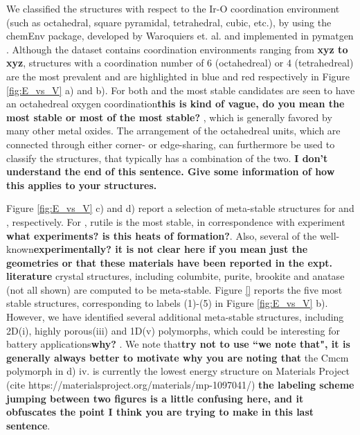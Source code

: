 We classified the structures with respect to the Ir-O coordination environment (such as octahedral, square pyramidal, tetrahedral, cubic, etc.), by using the chemEnv package, developed by Waroquiers et. al. \cite{Waroquiers2017} and implemented in pymatgen \cite{Ong2013}. Although the dataset contains  coordination environments ranging from \textbf{xyz to xyz}, structures with a coordination number of 6 (octahedreal) or 4 (tetrahedreal) are the most prevalent and are highlighted in blue and red respectively in Figure \ref{fig:E_vs_V} a) and b). For both \IrOtwo and \IrOthree the most stable candidates are seen to have an octahedreal oxygen coordination\textbf{this is kind of vague, do you mean the most stable or most of the most stable?} , which is generally favored by many other metal oxides. \cite{Waroquiers2017} The arrangement of the octahedreal units, which are connected through either corner- or edge-sharing, can furthermore be used to classify the structures, that typically has a combination of the two. \textbf{I don't understand the end of this sentence.  Give some information of how this applies to your structures.}

Figure \ref{fig:E_vs_V} c) and d) report a selection of meta-stable structures for \IrOtwo and \IrOthree, respectively. For \IrOtwo, rutile is the most stable, in correspondence with experiment \cite{}\textbf{what experiments?  is this  heats of formation?}. Also, several of the well-known\textbf{experimentally?  it is not clear here if you mean just the geometries or that these materials have been reported in the expt. literature} crystal structures, including  columbite, purite, brookite and anatase (not all shown) are computed to be meta-stable.
Figure \ref{} reports the five most stable \IrOthree structures, corresponding to labels (1)-(5) in Figure \ref{fig:E_vs_V} b). However, we have identified several additional meta-stable structures, including 2D(i), highly porous(iii) and 1D(v) polymorphs, which could be interesting for battery applications\textbf{why?} \cite{}. We note that\textbf{try not to use ``we note that", it is generally always better to motivate why you are noting that} the Cmcm polymorph in d) iv. is currently the lowest energy structure on Materials Project (cite https://materialsproject.org/materials/mp-1097041/) \cite{} \textbf{the labeling scheme jumping between two figures is a little confusing here, and it obfuscates the point I think you are trying to make in this last sentence}.




%



